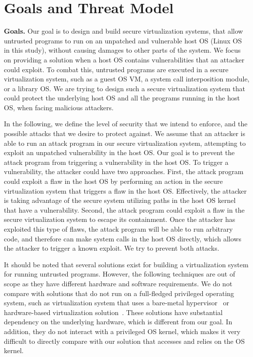 \section{Goals and Threat Model}
\label{sec.motivation-and-background}

\textbf{Goals.}
Our goal is to design and build secure virtualization systems, that allow untrusted programs to run
on an unpatched and vulnerable host OS (Linux OS in this study), without causing damages to other parts of the system.
We focus on providing a solution when a host OS contains vulnerabilities
that an attacker could exploit. To combat this, untrusted programs are executed in a secure virtualization system,
such as a guest OS VM, a system call interposition module, or a library OS. We are trying to design such a secure virtualization system
that could protect the underlying host OS and all the programs running in the host OS, when facing malicious attackers.

In the following, we define the level of security that we intend to enforce, and the possible attacks that we desire to protect against.
We assume that an attacker is able to run an attack program in our secure virtualization system, attempting to
exploit an unpatched vulnerability in the host OS. Our goal is to prevent the attack program from
triggering a vulnerability in the host OS.
To trigger a vulnerability, the attacker could have two approaches.
First, the attack program could exploit a flaw in the host OS by
performing an action in the secure virtualization system that triggers a flaw in
the host OS. Effectively, the attacker is taking advantage of the secure
system utilizing paths in the host OS kernel that have a vulnerability.
Second, the attack program could exploit a flaw in the secure virtualization system to
escape its containment. 
Once the attacker has exploited this type of flaws, the
attack program will be able to run arbitrary code, and therefore
can make system calls in the host OS directly, which allows
the attacker to trigger a known exploit. We try to prevent both attacks.

It should be noted that several solutions exist for building a virtualization system for running untrusted programs.
However, the following techniques are out of scope as they have different hardware and software requirements.
We do not compare with solutions that do not run on a full-fledged
privileged operating system, such as virtualization system that uses a
bare-metal hypervisor~\cite{Xen-03} or hardware-based virtualization
solution~\cite{IntelVT}. These solutions have substantial dependency on the underlying hardware, which is
different from our goal. In addition, they do not interact with a privileged OS kernel, which makes it very difficult
to directly compare with our solution that accesses and relies on the OS kernel.


